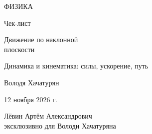 \documentclass[a4paper,12pt]{article}
\begin{document}
\thispagestyle{empty}
\begin{center}
\vspace*{29mm}
{\large\textcolor{darkaccent}{ФИЗИКА}}\par
\vspace{18mm}
{\LARGE\textcolor{textgray}{Чек-лист}}\par
\vspace{11mm}
{\LARGE\textcolor{accent}{Движение по наклонной\\[2pt] плоскости}}\par
\vspace{15mm}
{\normalsize Динамика и кинематика: силы, ускорение, путь}\par
\vspace{50mm}
{\normalsize Володя Хачатурян}\par
\vspace{13mm}
{\normalsize 12 ноября 2026 г.}\par
\vfill
{\small Лёвин Артём Александрович\\[-1pt] эксклюзивно для Володи Хачатуряна}\par
\vspace{15mm}
\end{center}
\clearpage
\end{document}
